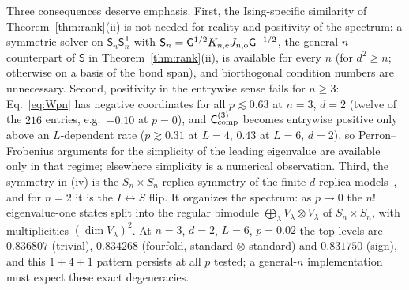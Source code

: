 \documentclass[aps,prx,reprint,superscriptaddress,nobibnotes,longbibliography]{revtex4-2}
\theoremstyle{remark}
\newcommand{\Ccomp}{\mathsf C_{\rm comp}}
\begin{document}
Three consequences deserve emphasis.  First, the Ising-specific similarity of Theorem~\ref{thm:rank}(ii) is not needed for reality and positivity of the spectrum: a symmetric solver on $\mathsf S_n\mathsf S_n^{\mathsf T}$ with $\mathsf S_n=\mathsf G^{1/2}K_{n,{\rm e}}J_{n,{\rm o}}\mathsf G^{-1/2}$, the general-$n$ counterpart of $\mathsf S$ in Theorem~\ref{thm:rank}(ii), is available for every $n$ (for $d^2\ge n$; otherwise on a basis of the bond span), and biorthogonal condition numbers are unnecessary.  Second, positivity in the entrywise sense fails for $n\ge3$: Eq.~\eqref{eq:Wpn} has negative coordinates for all $p\lesssim0.63$ at $n=3$, $d=2$ (twelve of the $216$ entries, e.g.\ $-0.10$ at $p=0$), and $\Ccomp^{(3)}$ becomes entrywise positive only above an $L$-dependent rate ($p\gtrsim0.31$ at $L=4$, $0.43$ at $L=6$, $d=2$), so Perron--Frobenius arguments for the simplicity of the leading eigenvalue are available only in that regime; elsewhere simplicity is a numerical observation.  Third, the symmetry in (iv) is the $S_n\times S_n$ replica symmetry of the finite-$d$ replica models~\cite{Jian2020}, and for $n=2$ it is the $I\leftrightarrow S$ flip.  It organizes the spectrum: as $p\to0$ the $n!$ eigenvalue-one states split into the regular bimodule $\bigoplus_\lambda V_\lambda\otimes V_\lambda$ of $S_n\times S_n$, with multiplicities $(\dim V_\lambda)^2$.  At $n=3$, $d=2$, $L=6$, $p=0.02$ the top levels are $0.836807$ (trivial), $0.834268$ (fourfold, standard$\,\otimes\,$standard) and $0.831750$ (sign), and this $1+4+1$ pattern persists at all $p$ tested; a general-$n$ implementation must expect these exact degeneracies.
\end{document}
